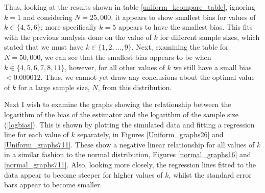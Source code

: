 \documentclass[12pt]{report}
\begin{document}
Thus, looking at the results shown in table \ref{uniform_kcompare_table}, ignoring $k=1$ and considering $N=25,000$, it appears to show smallest bias for values of $k \in \{4, 5, 6 \}$; more specifically $k=5$ appears to have the smallest bias. This fits with the previous analysis done on the value of $k$ for different sample sizes, which stated that we must have $k \in \{1, 2, ..., 9\}$. Next, examining the table for $N=50,000$, we can see that the smallest bias appears to be when $k \in \{ 4, 5, 6, 7, 8, 11\}$, however, for all other values of $k$ we still have a small bias $< 0.000012$. Thus, we cannot yet draw any conclusions about the optimal value of $k$ for a large sample size, $N$, from this distribution.

Next I wish to examine the graphs showing the relationship between the logarithm of the bias of the estimator and the logarithm of the sample size (\ref{logbias}). This is shown by plotting the simulated data and fitting a regression line for each value of $k$ separately, in Figures \ref{Uniform_graphs26} and \ref{Uniform_graphs711}. These show a negative linear relationship for all values of $k$ in a similar fashion to the normal distribution, Figures \ref{normal_graphs16} and \ref{normal_graphs711}. Also, looking more closely, the regression lines fitted to the data appear to become steeper for higher values of $k$, whilst the standard error bars appear to become smaller. 
\end{document}
